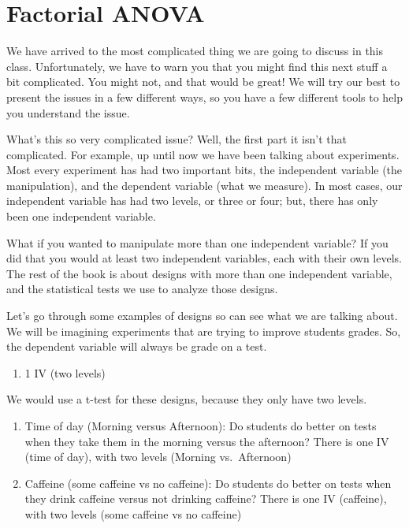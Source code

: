 \documentclass[
]{book}
\providecommand{\tightlist}{%
  \setlength{\itemsep}{0pt}\setlength{\parskip}{0pt}}
\begin{document}
\hypertarget{factorial-anova}{%
\chapter{Factorial ANOVA}\label{factorial-anova}}

We have arrived to the most complicated thing we are going to discuss in this class. Unfortunately, we have to warn you that you might find this next stuff a bit complicated. You might not, and that would be great! We will try our best to present the issues in a few different ways, so you have a few different tools to help you understand the issue.

What's this so very complicated issue? Well, the first part it isn't that complicated. For example, up until now we have been talking about experiments. Most every experiment has had two important bits, the independent variable (the manipulation), and the dependent variable (what we measure). In most cases, our independent variable has had two levels, or three or four; but, there has only been one independent variable.

What if you wanted to manipulate more than one independent variable? If you did that you would at least two independent variables, each with their own levels. The rest of the book is about designs with more than one independent variable, and the statistical tests we use to analyze those designs.

Let's go through some examples of designs so can see what we are talking about. We will be imagining experiments that are trying to improve students grades. So, the dependent variable will always be grade on a test.

\begin{enumerate}
\def\labelenumi{\arabic{enumi}.}
\tightlist
\item
  1 IV (two levels)
\end{enumerate}

We would use a t-test for these designs, because they only have two levels.

\begin{enumerate}
\def\labelenumi{\alph{enumi}.}
\item
  Time of day (Morning versus Afternoon): Do students do better on tests when they take them in the morning versus the afternoon? There is one IV (time of day), with two levels (Morning vs.~Afternoon)
\item
  Caffeine (some caffeine vs no caffeine): Do students do better on tests when they drink caffeine versus not drinking caffeine? There is one IV (caffeine), with two levels (some caffeine vs no caffeine)
\end{enumerate}
\end{document}
